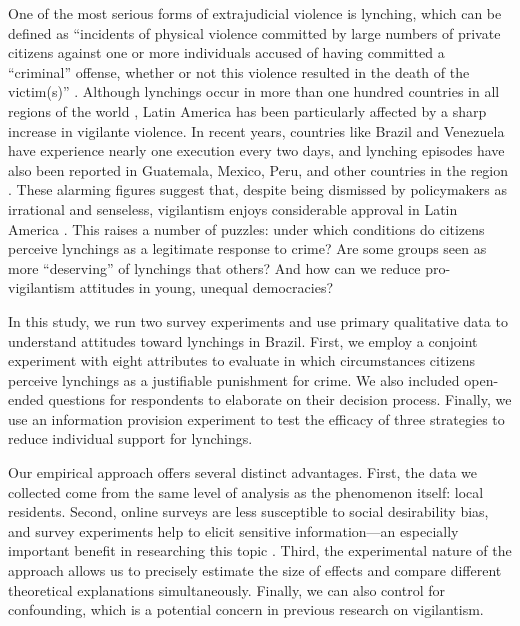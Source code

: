 \documentclass[12pt,a4paper]{article}
\begin{document}
One of the most serious forms of extrajudicial violence is lynching, which can
be defined as ``incidents of physical violence committed by large numbers of
private citizens against one or more individuals accused of having committed a
``criminal'' offense, whether or not this violence resulted in the death of the
victim(s)'' \citep[645]{godoy2004justice}. Although lynchings occur in more
than one hundred countries in all regions of the world
\citep[33]{jung2020lynching}, Latin America has been particularly affected by a
sharp increase in vigilante violence. In recent years, countries like Brazil
and Venezuela have experience nearly one execution every two days, and lynching
episodes have also been reported in Guatemala, Mexico, Peru, and other
countries in the region \citep{cruz2019determinants, godoy2004justice,
barbara2015vigilantes}. These alarming figures suggest that, despite being
dismissed by policymakers as irrational and senseless, vigilantism enjoys
considerable approval in Latin America \citep{berg2011globalizing,
goldstein2005flexible}. This raises a number of puzzles: under which conditions
do citizens perceive lynchings as a legitimate response to crime? Are some
groups seen as more ``deserving'' of lynchings that others? And how can we
reduce pro-vigilantism attitudes in young, unequal democracies?

In this study, we run two survey experiments and use primary qualitative data
to understand attitudes toward lynchings in Brazil. First, we employ a conjoint
experiment with eight attributes to evaluate in which circumstances citizens
perceive lynchings as a justifiable punishment for crime. We also included
open-ended questions for respondents to elaborate on their decision process.
Finally, we use an information provision experiment to test the efficacy of
three strategies to reduce individual support for lynchings.

Our empirical approach offers several distinct advantages. First, the data we
collected come from the same level of analysis as the phenomenon itself: local
residents. Second, online surveys are less susceptible to social desirability
bias, and survey experiments help to elicit sensitive information---an
especially important benefit in researching this topic \citep{grimm2010social}.
Third, the experimental nature of the approach allows us to precisely estimate
the size of effects and compare different theoretical explanations
simultaneously. Finally, we can also control for confounding, which is a
potential concern in previous research on vigilantism.
\end{document}
